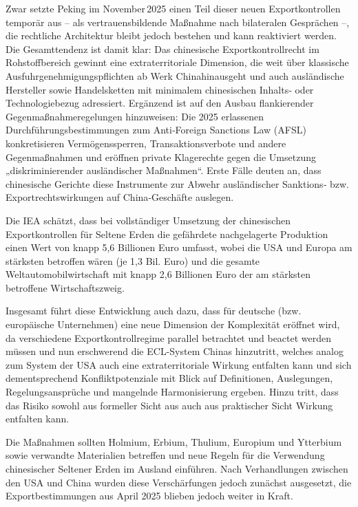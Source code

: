 \documentclass[12pt,a4paper,oneside]{book} %
\begin{document}
Zwar setzte Peking im November 2025 einen Teil dieser neuen Exportkontrollen temporär aus – als vertrauensbildende Maßnahme nach bilateralen Gesprächen –, die rechtliche Architektur bleibt jedoch bestehen und kann reaktiviert werden.  Die Gesamttendenz ist damit klar: Das chinesische Exportkontrollrecht im Rohstoffbereich gewinnt eine extraterritoriale Dimension, die weit über klassische Ausfuhrgenehmigungspflichten \glqq ab Werk China\grqq hinausgeht und auch ausländische Hersteller sowie Handelsketten mit minimalem chinesischen Inhalts‑ oder Technologiebezug adressiert. Ergänzend ist auf den Ausbau flankierender Gegenmaßnahmeregelungen hinzuweisen: Die 2025 erlassenen Durchführungsbestimmungen zum Anti‑Foreign Sanctions Law (AFSL) konkretisieren Vermögenssperren, Transaktionsverbote und andere Gegenmaßnahmen\autocite{https://www.wilmerhale.com/en/insights/client-alerts/20250331-china-further-formalizes-its-anti-foreign-sanctions-legal-arsenal-the-regulations-on-implementation-of-the-anti-foreign-sanctions-law} und eröffnen private Klagerechte gegen die Umsetzung „diskriminierender ausländischer Maßnahmen“.  Erste Fälle deuten an, dass chinesische Gerichte diese Instrumente zur Abwehr ausländischer Sanktions‑ bzw. Exportrechtswirkungen auf China‑Geschäfte auslegen.

Die IEA schätzt, dass bei vollständiger Umsetzung der chinesischen Exportkontrollen für Seltene Erden die gefährdete nachgelagerte Produktion einen Wert von knapp 5,6 Billionen Euro umfasst, wobei die USA und Europa am stärksten betroffen wären (je 1,3 Bil. Euro) und die gesamte Weltautomobilwirtschaft mit knapp 2,6 Billionen Euro der am stärksten betroffene Wirtschaftszweig.\autocite{IEA Bericht, S. 9 }

Insgesamt führt diese Entwicklung auch dazu, dass für deutsche (bzw. europäische Unternehmen) eine neue Dimension der Komplexität eröffnet wird, da verschiedene Exportkontrollregime parallel betrachtet und beactet werden müssen und nun erschwerend die ECL-System Chinas hinzutritt, welches analog zum System der USA auch eine extraterritoriale Wirkung entfalten kann und sich dementsprechend Konfliktpotenziale mit Blick auf Definitionen, Auslegungen, Regelungsansprüche und mangelnde Harmonisierung ergeben.\autocite[Insbesondere auch zur Extraterritorialität und der Reichweite der Exportkontrollregime]{EuZW 2025, 710, 711} Hinzu tritt, dass das Risiko sowohl aus formeller Sicht aus auch aus praktischer Sicht Wirkung entfalten kann.\autocite{ibid.}

 Die Maßnahmen sollten Holmium, Erbium, Thulium, Europium und Ytterbium sowie verwandte Materialien betreffen und neue Regeln für die Verwendung chinesischer Seltener Erden im Ausland einführen. Nach Verhandlungen zwischen den USA und China wurden diese Verschärfungen jedoch zunächst ausgesetzt, die Exportbestimmungen aus April 2025 blieben jedoch weiter in Kraft.
\end{document}
